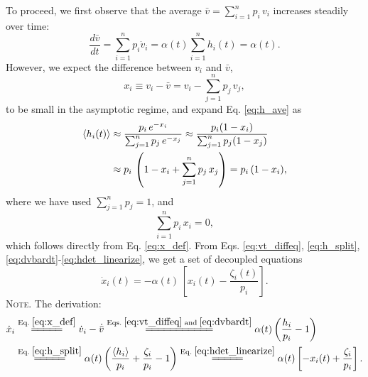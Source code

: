 \documentclass[reprint]{revtex4-1}
\newcommand{\note}[1]{{\color{DarkGreen}\footnotesize \textsc{Note.} #1}}
\begin{document}
To proceed, we first observe that
the average $\bar v = \sum_{i = 1}^n p_i \, v_i$
increases steadily over time:
%
\begin{equation}
\frac{ d \bar v } { d t }
=
\sum_{i = 1}^n p_i \dot v_i
=
\alpha(t) \sum_{i = 1}^n h_i(t) = \alpha(t).
\label{eq:dvbardt}
\end{equation}
%
However, we expect the difference between $v_i$ and $\bar v$,
%
\begin{equation}
  x_i \equiv v_i - \bar v = v_i - \sum_{j = 1}^n p_j \, v_j,
  \label{eq:x_def}
\end{equation}
%
to be small in the asymptotic regime,
and expand Eq. \eqref{eq:h_ave} as
%
\begin{align}
\langle h_i(t) \rangle
&\approx
\frac{                 p_i \, e^{- x_i} }
     { \sum_{ j = 1}^n p_j \, e^{- x_j} }
\approx
\frac{                 p_i (1 - x_i) }
     { \sum_{ j = 1}^n p_j (1 - x_j) }
\notag
\\
&\approx
p_i \, \left(
         1 - x_i + \sum_{j=1}^n p_j \, x_j
       \right)
=
p_i \, (1 - x_i),
\label{eq:hdet_linearize}
\end{align}
%
where we have used $\sum_{j=1}^n p_j = 1$,
and
%
\begin{equation}
  \sum_{i = 1}^n p_i \, x_i = 0,
  \label{eq:px_sum}
\end{equation}
which follows directly from Eq. \eqref{eq:x_def}.
%
From Eqs.
\eqref{eq:vt_diffeq},
\eqref{eq:h_split},
\eqref{eq:dvbardt}-\eqref{eq:hdet_linearize},
we get a set of decoupled equations
%
\begin{equation}
  \dot x_i(t)
  =
  -\alpha(t) \, \left[ x_i(t) - \frac{ \zeta_i(t) } { p_i } \right].
  \label{eq:dxdt_WL}
\end{equation}
\note{The derivation:
$$
\begin{aligned}
  \dot x_i
  &\stackrel{\mathrm{Eq.\; \eqref{eq:x_def}}}
            {=\joinrel=\joinrel=\joinrel=\joinrel=}
  \dot v_i - \dot{ \bar v }
  \stackrel{\mathrm{Eqs.\; \eqref{eq:vt_diffeq}\; and\; \eqref{eq:dvbardt}}}
            {=\joinrel=\joinrel=\joinrel=\joinrel=\joinrel=\joinrel=\joinrel=\joinrel=\joinrel=\joinrel=}
  \alpha(t) \left( \frac{ h_i } { p_i } - 1 \right)
  \\
  &\stackrel{\mathrm{Eq.\; \eqref{eq:h_split}}}
            {=\joinrel=\joinrel=\joinrel=\joinrel=}
  \alpha(t) \left( \frac{ \langle h_i \rangle } { p_i } + \frac{ \zeta_i } { p_i } - 1 \right)
  \stackrel{\mathrm{Eq.\; \eqref{eq:hdet_linearize}}}
            {=\joinrel=\joinrel=\joinrel=\joinrel=}
  \alpha(t) \left[ -x_i(t) + \frac{ \zeta_i } { p_i } \right].
\end{aligned}
$$
}
\end{document}
